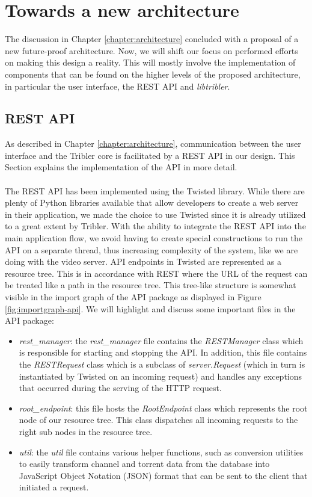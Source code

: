 \chapter{Towards a new architecture}
\label{chapter:towards-new-architecture}
The discussion in Chapter \ref{chapter:architecture} concluded with a proposal of a new future-proof architecture. Now, we will shift our focus on performed efforts on making this design a reality. This will mostly involve the implementation of components that can be found on the higher levels of the proposed architecture, in particular the user interface, the REST API and \emph{libtribler}.

\section{REST API}
As described in Chapter \ref{chapter:architecture}, communication between the user interface and the Tribler core is facilitated by a REST API in our design. This Section explains the implementation of the API in more detail.\\\\
The REST API has been implemented using the Twisted library. While there are plenty of Python libraries available that allow developers to create a web server in their application, we made the choice to use Twisted since it is already utilized to a great extent by Tribler. With the ability to integrate the REST API into the main application flow, we avoid having to create special constructions to run the API on a separate thread, thus increasing complexity of the system, like we are doing with the video server. API endpoints in Twisted are represented as a resource tree. This is in accordance with REST where the URL of the request can be treated like a path in the resource tree. This tree-like structure is somewhat visible in the import graph of the API package as displayed in Figure \ref{fig:importgraph-api}. We will highlight and discuss some important files in the API package:
\begin{itemize}
	\item \emph{rest\_manager}: the \emph{rest\_manager} file contains the \emph{RESTManager} class which is responsible for starting and stopping the API. In addition, this file contains the \emph{RESTRequest} class which is a subclass of \emph{server.Request} (which in turn is instantiated by Twisted on an incoming request) and handles any exceptions that occurred during the serving of the HTTP request.
	\item \emph{root\_endpoint}: this file hosts the \emph{RootEndpoint} class which represents the root node of our resource tree. This class dispatches all incoming requests to the right sub nodes in the resource tree.
	\item \emph{util}: the \emph{util} file contains various helper functions, such as conversion utilities to easily transform channel and torrent data from the database into JavaScript Object Notation (JSON) format that can be sent to the client that initiated a request.
\end{itemize}

